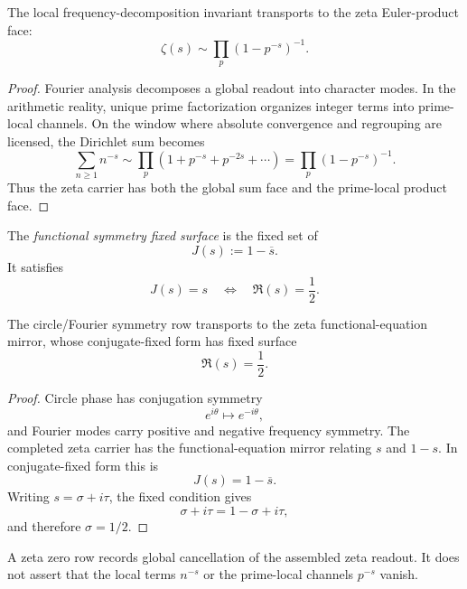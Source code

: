 \begin{theorem}
\label{thm:unified-reality-zeta-prime-local-factorization}
The local frequency-decomposition invariant transports to the zeta
Euler-product face:
$$
\zeta(s)\sim\prod_p(1-p^{-s})^{-1}.
$$
\end{theorem}

\begin{proof}
Fourier analysis decomposes a global readout into character modes. In
the arithmetic reality, unique prime factorization organizes integer
terms into prime-local channels. On the window where absolute
convergence and regrouping are licensed, the Dirichlet sum becomes
$$
\sum_{n\ge1}n^{-s}
\sim
\prod_p(1+p^{-s}+p^{-2s}+\cdots)
=
\prod_p(1-p^{-s})^{-1}.
$$
Thus the zeta carrier has both the global sum face and the prime-local
product face.
\end{proof}

\begin{definition}
\label{def:unified-reality-zeta-functional-symmetry-fixed-surface}
The \emph{functional symmetry fixed surface} is the fixed set of
$$
J(s):=1-\overline{s}.
$$
It satisfies
$$
J(s)=s
\quad\Longleftrightarrow\quad
\Re(s)=\frac12.
$$
\end{definition}

\begin{theorem}
\label{thm:unified-reality-zeta-functional-mirror}
The circle/Fourier symmetry row transports to the zeta functional-equation
mirror, whose conjugate-fixed form has fixed surface
$$
\Re(s)=\frac12.
$$
\end{theorem}

\begin{proof}
Circle phase has conjugation symmetry
$$
e^{i\theta}\mapsto e^{-i\theta},
$$
and Fourier modes carry positive and negative frequency symmetry. The
completed zeta carrier has the functional-equation mirror relating
$s$ and $1-s$. In conjugate-fixed form this is
$$
J(s)=1-\overline{s}.
$$
Writing $s=\sigma+i\tau$, the fixed condition gives
$$
\sigma+i\tau=1-\sigma+i\tau,
$$
and therefore $\sigma=1/2$.
\end{proof}

\begin{theorem}
\label{thm:unified-reality-zeta-zero-global-cancellation-row}
A zeta zero row records global cancellation of the assembled zeta
readout. It does not assert that the local terms $n^{-s}$ or the
prime-local channels $p^{-s}$ vanish.
\end{theorem}

